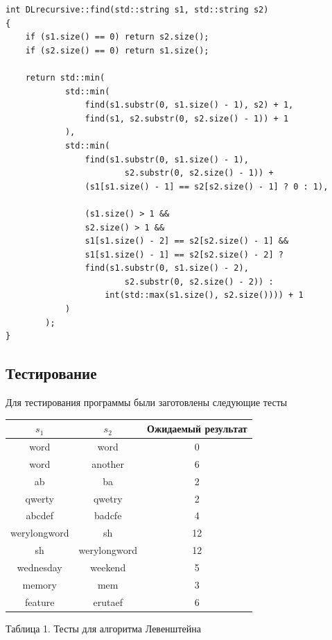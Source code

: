 \documentclass[a4paper,12pt]{article}
\begin{document}
\begin{lstlisting}[caption=Расстояние Дамерау-Левенштейна рекурсивный метод]
int DLrecursive::find(std::string s1, std::string s2)
{
    if (s1.size() == 0) return s2.size();
    if (s2.size() == 0) return s1.size();

    return std::min(
            std::min(
                find(s1.substr(0, s1.size() - 1), s2) + 1,
                find(s1, s2.substr(0, s2.size() - 1)) + 1
            ),
            std::min(
                find(s1.substr(0, s1.size() - 1),
                        s2.substr(0, s2.size() - 1)) +
                (s1[s1.size() - 1] == s2[s2.size() - 1] ? 0 : 1),

                (s1.size() > 1 &&
                s2.size() > 1 &&
                s1[s1.size() - 2] == s2[s2.size() - 1] &&
                s1[s1.size() - 1] == s2[s2.size() - 2] ?
                find(s1.substr(0, s1.size() - 2),
                        s2.substr(0, s2.size() - 2)) :
                    int(std::max(s1.size(), s2.size()))) + 1
            )
        );
}

\end{lstlisting}

\subsection{Тестирование}

Для тестирования программы были заготовлены следующие тесты

\hfill

\begin{center}
    \begin{tabular}{|c|c|c|}
        \hline
        $s_1$ & $s_2$ & Ожидаемый результат \\
        \hline
        word & word & 0 \\
        \hline
        word & another & 6 \\
        \hline
        ab & ba & 2 \\
        \hline
        qwerty & qwetry & 2 \\
        \hline
        abcdef & badcfe & 4 \\
        \hline
        werylongword & sh & 12 \\
        \hline
        sh & werylongword & 12 \\
        \hline
        wednesday & weekend & 5 \\
        \hline
        memory & mem & 3 \\
        \hline
        feature & erutaef & 6 \\
        \hline
    \end{tabular}

    Таблица 1. Тесты для алгоритма Левенштейна
\end{center}
\end{document}
